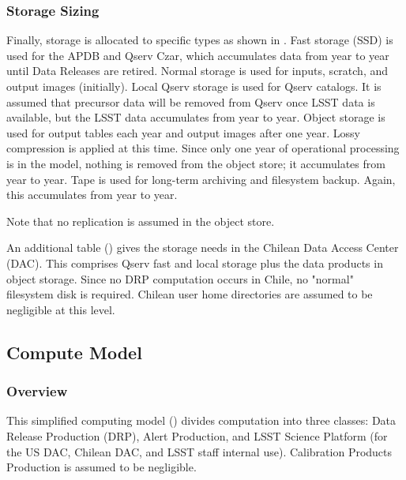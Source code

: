 

\subsubsection{Storage Sizing}

Finally, storage is allocated to specific types as shown in .
Fast storage (SSD) is used for the APDB and Qserv Czar, which accumulates data from year to year until Data Releases are retired.
Normal storage is used for inputs, scratch, and output images (initially).
Local Qserv storage is used for Qserv catalogs.
It is assumed that precursor data will be removed from Qserv once LSST data is available, but the LSST data accumulates from year to year.
Object storage is used for output tables each year and output images after one year.
Lossy compression is applied at this time.
Since only one year of operational processing is in the model, nothing is removed from the object store; it accumulates from year to year.
Tape is used for long-term archiving and filesystem backup.
Again, this accumulates from year to year.

Note that no replication is assumed in the object store.



An additional table () gives the storage needs in the Chilean Data Access Center (DAC).
This comprises Qserv fast and local storage plus the data products in object storage.
Since no DRP computation occurs in Chile, no "normal" filesystem disk is required.
Chilean user home directories are assumed to be negligible at this level.



\subsection{Compute Model}



\subsubsection{Overview}
This simplified computing model () divides computation into three classes: Data Release Production (DRP), Alert Production, and LSST Science Platform (for the US DAC, Chilean DAC, and LSST staff internal use).
Calibration Products Production is assumed to be negligible.

